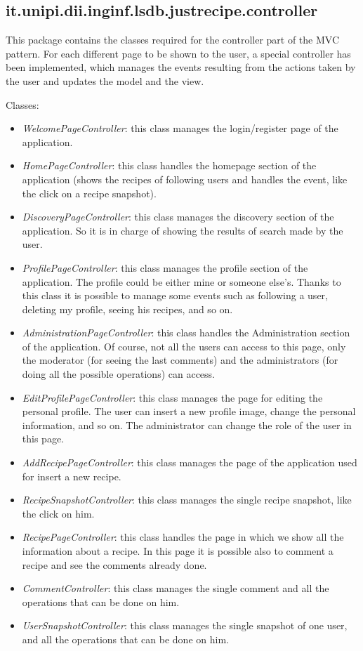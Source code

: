 \documentclass[a4paper]{report}
\begin{document}
\subsection {it.unipi.dii.inginf.lsdb.justrecipe.controller}
This package contains the classes required for the controller part of the MVC pattern. For each different page to be shown to the user, a special controller has been implemented, which manages the events resulting from the actions taken by the user and updates the model and the view.

\noindent Classes:
 \begin{itemize}
	\item \emph{WelcomePageController}: this class manages the login/register page of the application.
	\item \emph{HomePageController}: this class handles the homepage section of the application (shows the recipes of following users and handles the event, like the click on a recipe snapshot).
	\item \emph{DiscoveryPageController}: this class manages the discovery section of the application. So it is in charge of showing the results of search made by the user.
	\item \emph{ProfilePageController}: this class manages the profile section of the application. The profile could be either mine or someone else's. Thanks to this class it is possible to manage some events such as following a user, deleting my profile, seeing his recipes, and so on.
	\item \emph{AdministrationPageController}: this class handles the Administration section of the application. Of course, not all the users can access to this page, only the moderator (for seeing the last comments) and the administrators (for doing all the possible operations) can access.
	\item \emph{EditProfilePageController}: this class manages the page for editing the personal profile. The user can insert a new profile image, change the personal information, and so on. The administrator can change the role of the user in this page.
	\item \emph{AddRecipePageController}: this class manages the page of the application used for insert a new recipe. 
	\item \emph{RecipeSnapshotController}: this class manages the single recipe snapshot, like the click on him.
	\item \emph{RecipePageController}: this class handles the page in which we show all the information about a recipe. In this page it is possible also to comment a recipe and see the comments already done.
	\item \emph{CommentController}: this class manages the single comment and all the operations that can be done on him.
	\item \emph{UserSnapshotController}: this class manages the single snapshot of one user, and all the operations that can be done on him.
\end{itemize}
\end{document}
